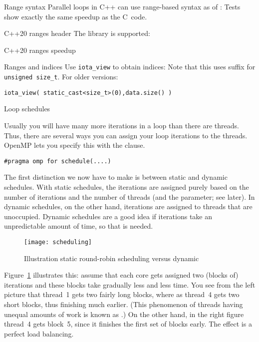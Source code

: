 \begin{cppnote}{Range syntax}
  Parallel loops in C++ can use range-based syntax as of :
  Tests show exactly the same speedup as the C~code.
\end{cppnote}

\begin{cppnote}{C++20 ranges header}
  The   library is supported:
\end{cppnote}

\begin{cppnote}{C++20 ranges speedup}
  
\end{cppnote}

\begin{cppnote}{Ranges and indices}
  Use \lstinline{iota_view} to obtain indices:
  Note that this uses  suffix for
  \lstinline{unsigned size_t}. For older versions:
\begin{lstlisting}
iota_view( static_cast<size_t>(0),data.size() )
\end{lstlisting}
\end{cppnote}

 {Loop schedules}
\label{sec:schedule}

Usually you will have many more iterations in a loop than there are threads.
Thus, there are several ways you can assign your loop iterations to the threads.
OpenMP lets you specify this with the  clause.
\begin{lstlisting}[language=omp]
#pragma omp for schedule(....)
\end{lstlisting}

The first distinction we now have to make is between static and dynamic schedules.
With static schedules, the iterations are assigned purely based on the number
of iterations and the number of threads (and the  parameter; see later).
In dynamic schedules, on the other hand, iterations are assigned to threads that
are unoccupied. Dynamic schedules are a good idea if iterations take an unpredictable
amount of time, so that  is needed.

\begin{figure}[ht]
  \texttt{[image: scheduling]}
  \caption{Illustration static round-robin scheduling versus dynamic}
  \label{fig:omp-robin}
\end{figure}
%
Figure~\ref{fig:omp-robin} illustrates this: assume that each core
gets assigned two (blocks of) iterations and these blocks take
gradually less and less time. You see from the left picture that
thread~1 gets two fairly long blocks, where as thread~4 gets two short
blocks, thus finishing much earlier. (This phenomenon of threads
having unequal amounts of work is known as
.)
On the other hand, in the right figure thread~4 gets
block~5, since it finishes the first set of blocks early. The effect
is a perfect load balancing.

